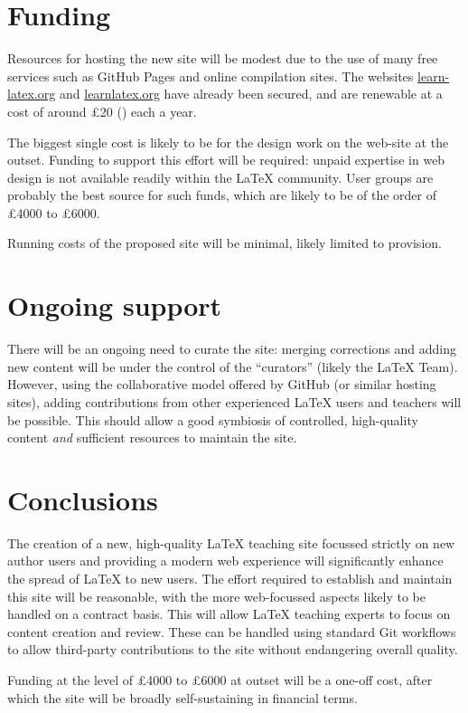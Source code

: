 \documentclass{article}
\begin{document}
\section{Funding}

Resources for hosting the new site will be modest due to the use of many free
services such as GitHub Pages and online compilation sites. The websites
\url{learn-latex.org} and \url{learnlatex.org} have already been secured, and
are renewable at a cost of around \pounds 20 () each a year.

The biggest single cost is likely to be for the design work on the web-site at
the outset. Funding to support this effort will be required: unpaid expertise
in web design is not available readily within the \LaTeX{} community. User
groups are probably the best source for such funds, which are likely to be of
the order of \pounds 4000 to \pounds 6000.

Running costs of the proposed site will be minimal, likely limited
to  provision.

\section{Ongoing support}

There will be an ongoing need to curate the site: merging corrections and
adding new content will be under the control of the \enquote{curators} (likely
the \LaTeX{} Team). However, using the collaborative model offered by GitHub
(or similar hosting sites), adding contributions from other experienced
\LaTeX{} users and teachers will be possible. This should allow a good
symbiosis of controlled, high-quality content \emph{and} sufficient resources
to maintain the site.

\section{Conclusions}

The creation of a new, high-quality \LaTeX{} teaching site focussed strictly on new author users and
providing a modern web experience will significantly enhance the spread of
\LaTeX{} to new users. The effort required to establish and maintain this site
will be reasonable, with the more web-focussed aspects likely to be
handled on a contract basis. This will allow  \LaTeX{} teaching experts to
focus on content creation and review. These can be handled using standard
Git workflows to allow third-party contributions
to the site without endangering overall quality.

Funding at the level of \pounds 4000 to \pounds 6000 at outset will be a
one-off cost, after which the site will be broadly self-sustaining in
financial terms.
\end{document}

